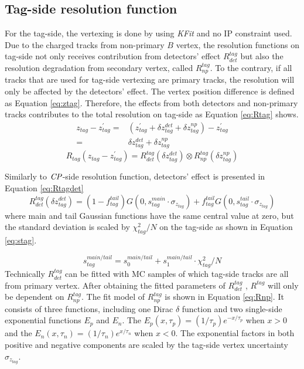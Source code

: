 \subsection{Tag-side resolution function}

For the tag-side, the vertexing is done by using \textit{KFit} and no IP constraint used. Due to the charged tracks from non-primary $B$ vertex, the resolution functions on tag-side not only receives contribution from detectors' effect $R_{det}^{tag}$ but also the resolution degradation from secondary vertex, called $R_{np}^{tag}$. To the contrary, if all tracks that are used for tag-side vertexing are primary tracks, the resolution will only be affected by the detectors' effect. The vertex position difference is defined as Equation \ref{eq:ztag}. Therefore, the effects from both detectors and non-primary tracks contributes to the total resolution on tag-side as Equation \ref{eq:Rtag} shows.
\begin{equation}\label{eq:ztag}
\begin{split}
z_{tag} - z_{tag}^{'} =& (z_{tag}^{'} + \delta z_{tag}^{det} + \delta z_{tag}^{np}) - z_{tag}^{'}\\
=&\delta z_{tag}^{det} + \delta z_{tag}^{np}
\end{split}
\end{equation}
\begin{equation}\label{eq:Rtag}
R_{tag}( z_{tag}- z_{tag}^{'}) = R_{det}^{tag}(\delta z_{tag}^{det}) \otimes
R_{np}^{tag}( \delta z_{tag}^{np})
\end{equation}

Similarly to $\it{CP}$-side resolution function, detectors' effect is presented in Equation \ref{eq:Rtagdet}
\begin{equation}\label{eq:Rtagdet}
R_{det}^{tag}(\delta z_{tag}^{det}) = (1-f_{tag}^{tail})G(0,s_{tag}^{main}\cdot\sigma_{z_{tag}})+
f_{tag}^{tail}G(0,s_{tag}^{tail}\cdot\sigma_{z_{tag}})
\end{equation} where main and tail Gaussian functions have the same central value at zero, but the standard deviation is scaled by $\chi^2_{tag}/N$ on the tag-side as shown in Equation \ref{eq:stag}.

\begin{equation}\label{eq:stag}
s_{tag}^{main/tail} = s_0^{main/tail} + s_1^{main/tail}\cdot\chi^2_{tag}/N
\end{equation} 
Technically $R^{tag}_{det}$ can be fitted with MC samples of which tag-side tracks are all from primary vertex. After obtaining the fitted parameters of $R^{tag}_{det}$ , $R^{tag}$ will only be dependent on $R^{tag}_{np}$. The fit model of $R_{np}^{tag}$ is shown in Equation \ref{eq:Rnp}. It consists of three functions, including one Dirac $\delta$ function and two single-side exponential functions $E_p$ and $E_n$. The $E_p(x,\tau_p)=(1/\tau_p)e^{-x/\tau_p} $ when $x > 0$ and the $E_n(x,\tau_n)=(1/\tau_n)e^{x/\tau_n} $ when $x < 0$.
The exponential factors in both positive and negative components are scaled by the tag-side vertex uncertainty $\sigma_{z_{tag}}$. 

